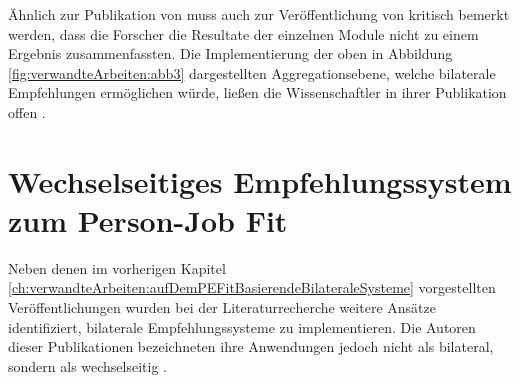 Ähnlich zur Publikation von \textcite[S. 3ff.]{malinowski:2006} muss auch zur Veröffentlichung von \textcite[S. 5ff.]{keim:2007} kritisch bemerkt werden, dass die Forscher die Resultate der einzelnen Module nicht zu einem Ergebnis zusammenfassten. Die Implementierung der oben in Abbildung \ref{fig:verwandteArbeiten:abb3} dargestellten Aggregationsebene, welche bilaterale Empfehlungen ermöglichen würde, ließen die Wissenschaftler in ihrer Publikation offen \cite[S. 8]{keim:2007}.

\section{Wechselseitiges Empfehlungssystem zum Person-Job Fit}
\label{ch:verwandteArbeiten:nichtAufDemPEFitBasierendeBilateraleSysteme}
Neben denen im vorherigen Kapitel \ref{ch:verwandteArbeiten:aufDemPEFitBasierendeBilateraleSysteme} vorgestellten Veröffentlichungen wurden bei der Literaturrecherche weitere Ansätze identifiziert, bilaterale Empfehlungssysteme zu implementieren. Die Autoren dieser Publikationen bezeichneten ihre Anwendungen jedoch nicht als bilateral, sondern als wechselseitig \cite[S. 1]{hong:2013b}\cite[S. 1]{wenxing:2015}.

